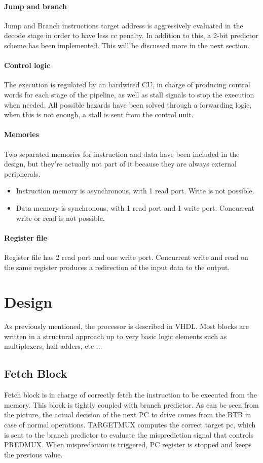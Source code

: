 \documentclass[12pt]{article}
\begin{document}
\paragraph{Jump and branch}
Jump and Branch instructions target address is aggressively evaluated in the decode stage in order to have less cc penalty.
In addition to this, a 2-bit predictor scheme has been implemented. This will be discussed more in the next section.
\paragraph{Control logic}
The execution is regulated by an hardwired CU, in charge of producing control words for each stage of the pipeline, as well as stall signals to stop the execution when needed.
All possible hazards have been solved through a forwarding logic, when this is not enough, a stall is sent from the control unit.
\paragraph{Memories}
Two separated memories for instruction and data have been included in the design, but they're actually not part of it because they are always external peripherals.
\begin{itemize}
\item Instruction memory is asynchronous, with 1 read port. Write is not possible.
\item Data memory is synchronous, with 1 read port and 1 write port. Concurrent write or read is not possible.
\end{itemize}
\paragraph{Register file}
Register file has 2 read port and one write port. Concurrent write and read on the same register produces a redirection of the input data to the output.

\section{Design}\label{Design}
As previously mentioned, the processor is described in VHDL. Most blocks are written in a structural approach up to very basic logic elements such as multiplexers, half adders, etc {...}

\subsection{Fetch Block}
Fetch block is in charge of correctly fetch the instruction to be executed from the memory. This block is tightly coupled with branch predictor. As can be seen from the picture, the actual decision of the next PC to drive comes from the BTB in case of normal operations.
TARGETMUX computes the correct target pc, which is sent to the branch predictor to evaluate the misprediction signal that controls PREDMUX.
When misprediction is triggered, PC register is stopped and keeps the previous value.
\end{document}
